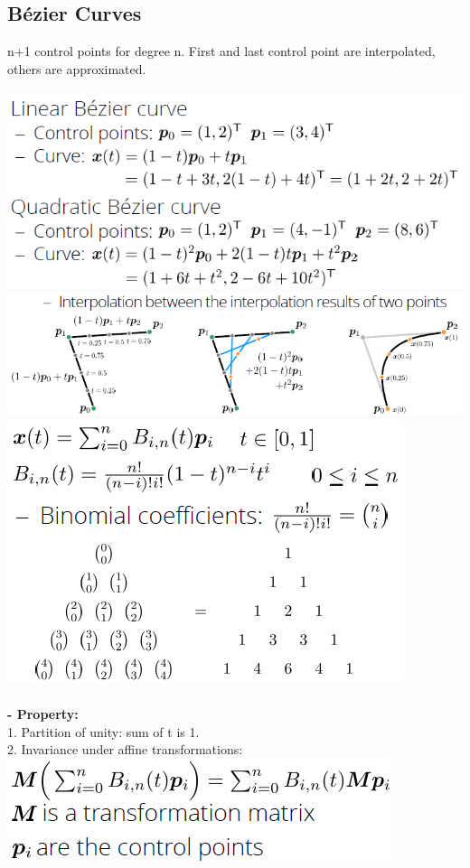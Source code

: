 \documentclass{article}
\begin{document}
\subsection{Bézier Curves}
n+1 control points for degree n. First and last control point are interpolated, others are approximated.\\\\
\includegraphics[scale=0.6]{image64.png}
\includegraphics[scale=0.6]{image65.png}
\includegraphics[scale=0.6]{image66.png}\\\\
\textbf{- Property: }\\
1. Partition of unity: sum of t is 1.\\
2. Invariance under affine transformations:\\
\includegraphics[scale=0.5]{image68.png}
\end{document}
